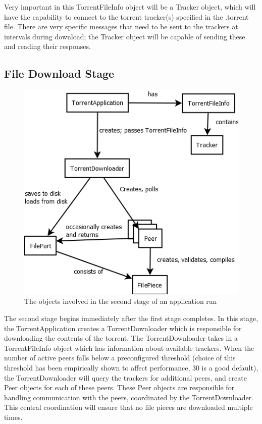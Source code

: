 \documentclass[letter]{scrartcl}
\begin{document}
Very important in this TorrentFileInfo object will be a Tracker object, which will have the capability to connect to the torrent tracker(s) specified in the .torrent file.  There are very specific messages that need to be sent to the trackers at intervals during download; the Tracker object will be capable of sending these and reading their responses.

\subsection{File Download Stage}

\begin{figure}[h]
\centering
\includegraphics[scale=.5]{stepTwo.png}
\caption{The objects involved in the second stage of an application run}
\end{figure}

The second stage begins immediately after the first stage completes.   In this stage, the TorrentApplication creates a TorrentDownloader which is responsible for downloading the contents of the torrent.  The TorrentDownloader takes in a TorrentFileInfo object which has information about available trackers.  When the number of active peers falls below a preconfigured threshold (choice of this threshold has been empirically shown to affect performance, 30 is a good default), the TorrentDownloader will query the trackers for additional peers, and create Peer objects for each of these peers.  These Peer objects are responsible for handling communication with the peers, coordinated by the TorrentDownloader.  This central coordination will ensure that no file pieces are downloaded multiple times.\\
\end{document}
